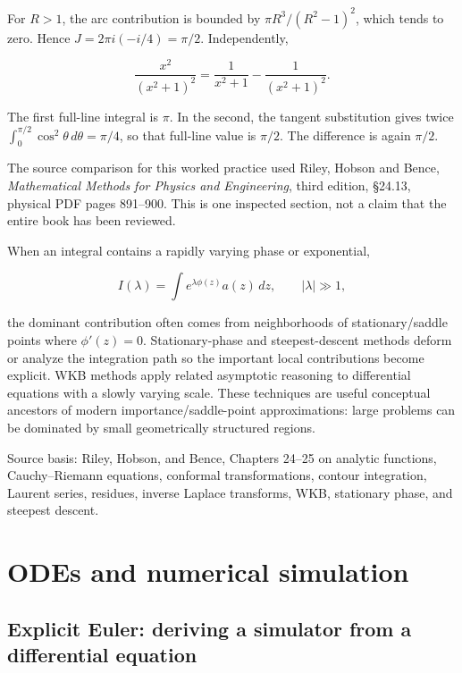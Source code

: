 For \(R>1\), the arc contribution is bounded by \(\pi R^3/(R^2-1)^2\), which tends to zero. Hence \(J=2\pi i(-i/4)=\pi/2\). Independently,

\[
\frac{x^2}{(x^2+1)^2}=\frac{1}{x^2+1}-\frac{1}{(x^2+1)^2}.
\]

The first full-line integral is \(\pi\). In the second, the tangent substitution gives twice \(\int_0^{\pi/2}\cos^2\theta\,d\theta=\pi/4\), so that full-line value is \(\pi/2\). The difference is again \(\pi/2\).

The source comparison for this worked practice used Riley, Hobson and Bence, \emph{Mathematical Methods for Physics and Engineering}, third edition, §24.13, physical PDF pages 891--900. This is one inspected section, not a claim that the entire book has been reviewed.

When an integral contains a rapidly varying phase or exponential,

\[
I(\lambda)
=
\int e^{\lambda\phi(z)}a(z)\,dz,
\qquad |\lambda|\gg1,
\]

the dominant contribution often comes from neighborhoods of stationary/saddle points where \(\phi'(z)=0\). Stationary-phase and steepest-descent methods deform or analyze the integration path so the important local contributions become explicit. WKB methods apply related asymptotic reasoning to differential equations with a slowly varying scale. These techniques are useful conceptual ancestors of modern importance/saddle-point approximations: large problems can be dominated by small geometrically structured regions.

Source basis: Riley, Hobson, and Bence, Chapters 24--25 on analytic functions, Cauchy--Riemann equations, conformal transformations, contour integration, Laurent series, residues, inverse Laplace transforms, WKB, stationary phase, and steepest descent.

\section{ODEs and numerical simulation}\label{02-foundations-ii-ch025-odes-and-numerical-simulation}

\subsection{Explicit Euler: deriving a simulator from a differential equation}\label{02-foundations-ii-ch025-explicit-euler-deriving-a-simulator-from-a-differential-equation}

